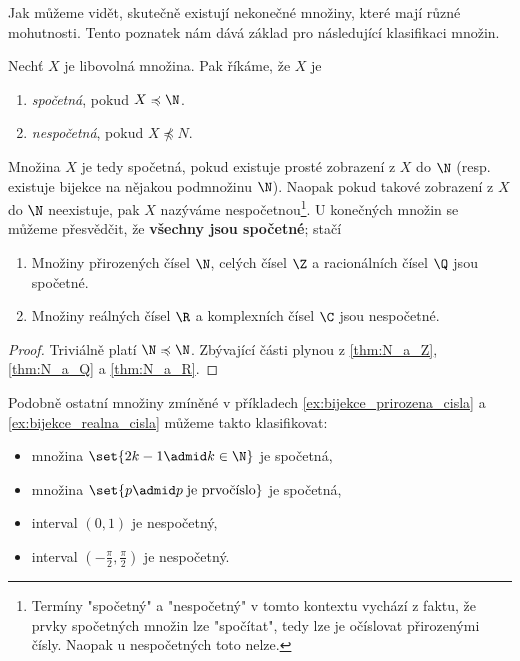 \needspace{1cm}
Jak můžeme vidět, skutečně existují nekonečné množiny, které mají různé mohutnosti.  Tento poznatek nám dává základ pro následující klasifikaci množin.
\begin{definition}\label{def:spocetna_a_nespocetna_mnozina}
    Nechť $X$ je libovolná množina. Pak říkáme, že $X$ je
    \begin{enumerate}[label=(\roman*)]
        \item \emph{spočetná}, pokud $X\preccurlyeq\N$.
        \item \emph{nespočetná}, pokud $X\not\preccurlyeq N$.
    \end{enumerate}
\end{definition}
Množina $X$ je tedy spočetná, pokud existuje prosté zobrazení z $X$ do $\N$ (resp. existuje bijekce na nějakou podmnožinu $\N$). Naopak pokud takové zobrazení z $X$ do $\N$ neexistuje, pak $X$ nazýváme nespočetnou\footnote{Termíny "spočetný" a "nespočetný" v tomto kontextu vychází z faktu, že prvky spočetných množin lze "spočítat", tedy lze je očíslovat přirozenými čísly. Naopak u nespočetných toto nelze.}. U konečných množin se můžeme přesvědčit, že \textbf{všechny jsou spočetné}; stačí 
\begin{theorem}\label{thm:spocetnost_ciselnych_oboru}
    \begin{enumerate}[label=(\roman*)]
        \item Množiny přirozených čísel $\N$, celých čísel $\Z$ a racionálních čísel $\Q$ jsou spočetné.
        \item Množiny reálných čísel $\R$ a komplexních čísel $\C$ jsou nespočetné.
    \end{enumerate}
\end{theorem}
\begin{proof}
    Triviálně platí $\N\preccurlyeq\N$. Zbývající části plynou z \ref{thm:N_a_Z}, \ref{thm:N_a_Q} a \ref{thm:N_a_R}.
\end{proof}
Podobně ostatní množiny zmíněné v příkladech \ref{ex:bijekce_prirozena_cisla} a \ref{ex:bijekce_realna_cisla} můžeme takto klasifikovat:
\begin{itemize}
    \item množina $\set{2k-1 \admid k\in\N}$ je spočetná,
    \item množina $\set{p \admid p\;\text{je prvočíslo}}$ je spočetná,
    \item interval $(0,1)$ je nespočetný,
    \item interval $\displaystyle\left(-\frac{\pi}{2},\frac{\pi}{2}\right)$ je nespočetný.
\end{itemize}
\medskip

